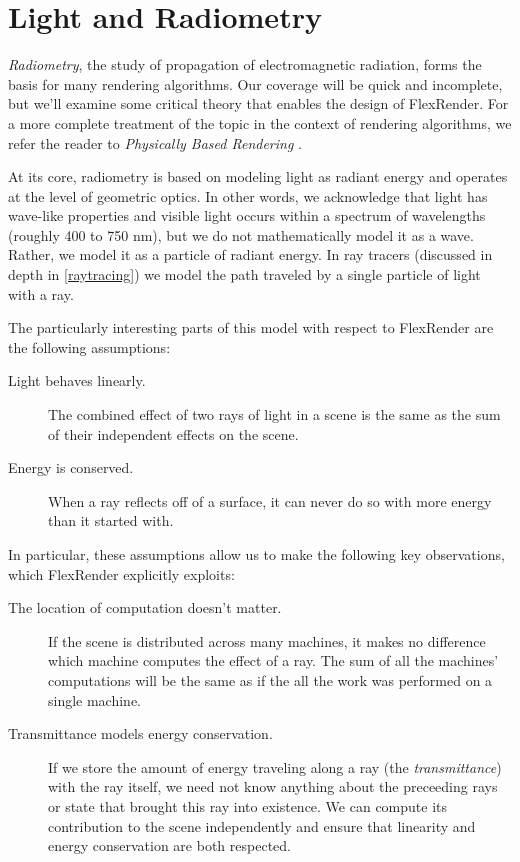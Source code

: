 \documentclass[12pt]{ucthesis}
\begin{document}
\section{Light and Radiometry}
\label{radiometry}

\emph{Radiometry}, the study of propagation of electromagnetic radiation, forms
the basis for many rendering algorithms. Our coverage will be quick and
incomplete, but we'll examine some critical theory that enables the design of
FlexRender. For a more complete treatment of the topic in the context of
rendering algorithms, we refer the reader to
\emph{Physically Based Rendering} \cite{pbrt}.

At its core, radiometry is based on modeling light as radiant energy and
operates at the level of geometric optics. In other words, we acknowledge that
light has wave-like properties and visible light occurs within a spectrum of
wavelengths (roughly 400 to 750 nm), but we do not mathematically model it as
a wave. Rather, we model it as a particle of radiant energy. In ray tracers
(discussed in depth in \ref{raytracing}) we model the path traveled by a single
particle of light with a ray.

The particularly interesting parts of this model with respect to FlexRender are
the following assumptions:

\begin{description}
    \item[Light behaves linearly.] The combined effect of two rays of light
        in a scene is the same as the sum of their independent effects on the
        scene.
    \item[Energy is conserved.] When a ray reflects off of a surface, it can
        never do so with more energy than it started with.
\end{description}

In particular, these assumptions allow us to make the following key
observations, which FlexRender explicitly exploits:

\begin{description}
    \item[The location of computation doesn't matter.] If the scene is
        distributed across many machines, it makes no difference which machine
        computes the effect of a ray. The sum of all the machines' computations
        will be the same as if the all the work was performed on a single
        machine.
    \item[Transmittance models energy conservation.] If we store the amount of
        energy traveling along a ray (the \emph{transmittance}) with the ray
        itself, we need not know anything about the preceeding rays or state
        that brought this ray into existence. We can compute its contribution
        to the scene independently and ensure that linearity and energy
        conservation are both respected.
\end{description}
\end{document}
